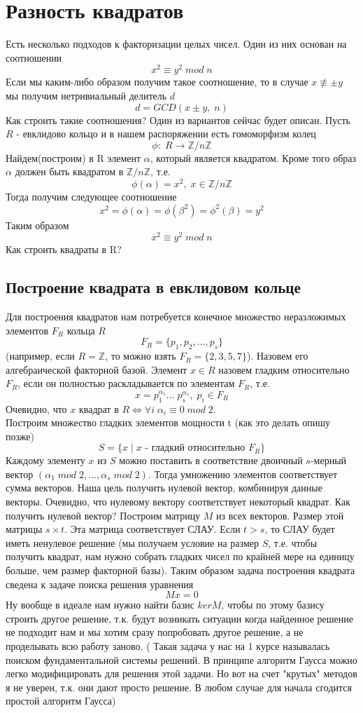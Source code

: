 \documentclass[oneside,final,14pt]{extreport}
\theoremstyle{plain}
\begin{document}
\chapter{Разность квадратов}
Есть несколько подходов к факторизации целых чисел. Один из них основан на соотношении $$x^2 \equiv y^2 \; mod \; n$$
Если мы каким-либо образом получим такое соотношение, то в случае $x \not \equiv \pm y$ мы получим нетривиальный делитель $d$
$$d=GCD(x \pm y,\; n)$$
Как строить такие соотношения? Один из вариантов сейчас будет описан. Пусть $R$ - евклидово кольцо и в нашем распоряжении есть гомоморфизм колец
$$
\phi: \; R \rightarrow {\mathbb{Z}}/{{n\mathbb{Z}}}
$$
Найдем(построим) в R элемент $\alpha$, который является квадратом. Кроме того образ $\alpha$ должен быть квадратом в $\mathbb{Z}/n\mathbb{Z}$, т.е. $$\phi(\alpha)=x^2,\; x \in \mathbb{Z}/n\mathbb{Z}$$
Тогда получим следующее соотношение
$$x^2=\phi(\alpha)=\phi(\beta^2)=\phi^2(\beta)=y^2$$
Таким образом $$x^2 \equiv y^2 \; mod \; n$$
Как строить квадраты в R?
\section{Построение квадрата в евклидовом кольце}
Для построения квадратов нам потребуется конечное множество неразложимых элементов $F_R$ кольца $R$
$$F_R=\{p_1,p_2,...,p_s\}$$
(например, если $R=\mathbb{Z}$, то можно взять $F_R=\{2,3,5,7\}$). Назовем его алгебраической факторной базой. Элемент $x \in R$ назовем гладким относительно $F_R$, если он полностью раскладывается по элементам  $F_R$, т.е.
$$x=p_1^{\alpha_1}...\;p_s^{\alpha_s}, \; p_i \in F_R$$
Очевидно, что $x$ квадрат в $R \Leftrightarrow \forall i \;\alpha_i \equiv 0 \; mod \; 2$.\\
Построим множество гладких элементов мощности t (как это делать опишу позже)
$$S=\{x \; | \; x\text{ - гладкий относительно }F_R\}$$
Каждому элементу $x$ из $S$ можно поставить в соответствие двоичный $s$-мерный вектор
$(\alpha_1 \; mod \; 2,...,\alpha_s \; mod \; 2)$. Тогда умножению элементов соответствует сумма векторов. Наша цель получить нулевой вектор, комбинируя данные векторы. Очевидно, что нулевому вектору соответствует некоторый квадрат. Как получить нулевой вектор?
Построим матрицу $M$ из всех векторов. Размер этой матрицы $s \times t$. Эта матрица соответствует СЛАУ. Если $t>s$, то СЛАУ будет иметь ненулевое решение (мы получаем условие на размер $S$, т.е. чтобы получить квадрат, нам нужно собрать гладких чисел по крайней мере на единицу больше, чем размер факторной базы).
Таким образом задача построения квадрата сведена к задаче поиска решения уравнения $$Mx=0$$
Ну вообще в идеале нам нужно найти базис $ker M$, чтобы по этому базису строить другое решение, т.к. будут возникать ситуации когда найденное решение не подходит нам и мы хотим сразу попробовать другое решение, а не проделывать всю работу заново. ( Такая задача у нас на 1 курсе называлась поиском фундаментальной системы решений. В принципе алгоритм Гаусса можно легко модифицировать для решения этой задачи. Но вот на счет "крутых" методов я не уверен, т.к. они дают просто решение. В любом случае для начала сгодится простой алгоритм Гаусса)
\end{document}
